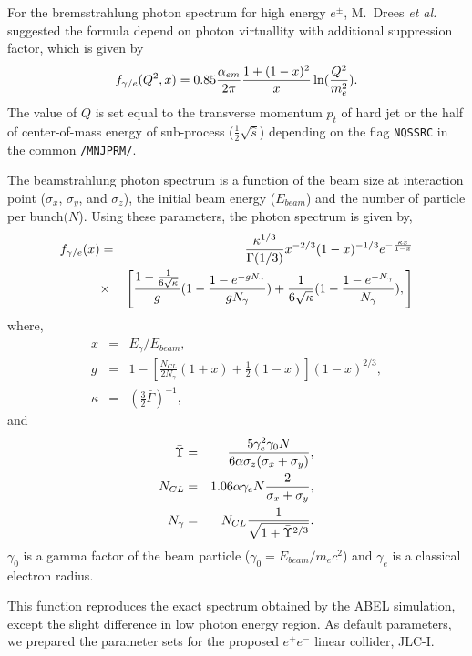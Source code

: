 For the bremsstrahlung photon spectrum for high energy
$e^\pm$, M.~Drees {\it et al.}\cite{DREESB} suggested the  
formula depend on photon virtuallity with additional suppression
factor, which is given by
\begin{equation}
f_{\gamma/e}(Q^2, x)=0.85{\alpha_{em}\over 2\pi}
  {1+(1-x)^2 \over x }
  \ln({Q^2\over m_e^2} ). \label{EQ_EPAMOD} 
\end{equation}
The value  of $Q$ is set equal to the transverse momentum
$p_t$ of hard jet
or the half of center-of-mass energy of sub-process ($\frac{1}{2}\sqrt{\hat{s}}$)
depending on the flag {\tt NQSSRC} in the common {\tt /MNJPRM/}. 

The beamstrahlung photon spectrum is a function of 
the beam size at interaction point ($\sigma_x$, $\sigma_y$,
and $\sigma_z$), the initial beam energy ($E_{beam}$) and
the number of particle per bunch$(N$). 
Using these parameters, the photon spectrum is given by\cite{BEAMSPECT},
\begin{eqnarray}
f_{\gamma/e}(x) &=&
{\kappa^{1/3}\over \Gamma(1/3)} x^{-2/3} (1-x)^{-1/3} 
   e^{-{\kappa x \over 1 - x}} \nonumber \\
&\times& \left[
{1-\frac{1}{6\sqrt{\kappa}} \over g}
(1 - { 1 - e^{-g N_\gamma} \over g N_\gamma } )
 + \frac{1}{6\sqrt{\kappa}}
(1 - { 1 - e^{-N_\gamma} \over N_\gamma } ), \right] \label{EQ_FLATBEAM}
\end{eqnarray}
\noindent where, 
\begin{eqnarray}
x&=& E_\gamma/E_{beam} ,\\
g&=& 1 - \left[ \frac{N_{CL}}{2N_\gamma} (1+x) 
   + \frac{1}{2} (1-x) \right] (1-x)^{2/3}, \\
\kappa&=& \left(\frac{3}{2} \bar{\Gamma} \right) ^{-1},
\end{eqnarray}
\noindent and
\begin{eqnarray}
\bar{\Upsilon}&=& { 5\gamma_e^2\gamma_0 N \over 
  6 \alpha \sigma_z (\sigma_x + \sigma_y) }, \\
N_{CL} &=& 1.06 \alpha\gamma_e N {2 \over {\sigma_x + \sigma_y}} ,\\
N_\gamma &=& N_{CL} { 1 \over \sqrt{ 1 + \bar{\Upsilon}^{2/3} }}. 
\end{eqnarray}
$\gamma_0$ is a gamma factor of the beam particle 
($\gamma_0=E_{beam}/m_e c^2$) and $\gamma_e$ is a classical electron radius.

This function reproduces the exact spectrum obtained by the 
ABEL simulation\cite{ABEL}, except the slight difference in low photon
energy region\cite{MIYAMOTO92}.  As default parameters,
we prepared the parameter sets for the proposed $e^+e^-$ linear
collider, JLC-I\cite{JLCI}.


